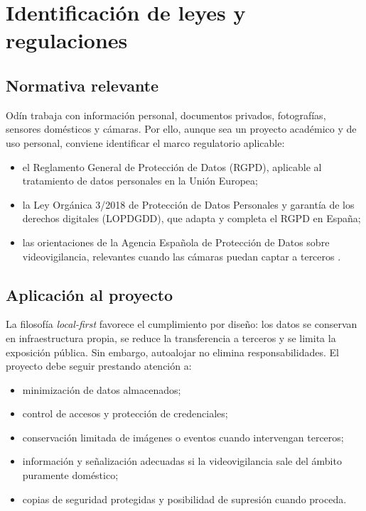 \chapter{Identificación de leyes y regulaciones}

\section{Normativa relevante}
Odín trabaja con información personal, documentos privados, fotografías, sensores domésticos y cámaras. Por ello, aunque sea un proyecto académico y de uso personal, conviene identificar el marco regulatorio aplicable:
\begin{itemize}
  \item el Reglamento General de Protección de Datos (RGPD), aplicable al tratamiento de datos personales en la Unión Europea;
  \item la Ley Orgánica 3/2018 de Protección de Datos Personales y garantía de los derechos digitales (LOPDGDD), que adapta y completa el RGPD en España;
  \item las orientaciones de la Agencia Española de Protección de Datos sobre videovigilancia, relevantes cuando las cámaras puedan captar a terceros \citep{gdprOfficial,lopdgddOfficial,aepdVideovigilancia}.
\end{itemize}

\section{Aplicación al proyecto}
La filosofía \textit{local-first} favorece el cumplimiento por diseño: los datos se conservan en infraestructura propia, se reduce la transferencia a terceros y se limita la exposición pública. Sin embargo, autoalojar no elimina responsabilidades. El proyecto debe seguir prestando atención a:
\begin{itemize}
  \item minimización de datos almacenados;
  \item control de accesos y protección de credenciales;
  \item conservación limitada de imágenes o eventos cuando intervengan terceros;
  \item información y señalización adecuadas si la videovigilancia sale del ámbito puramente doméstico;
  \item copias de seguridad protegidas y posibilidad de supresión cuando proceda.
\end{itemize}

